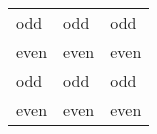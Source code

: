 \documentclass{article}
\begin{document}
    \begin{center}

        \begin{tabular}{lll}
            odd 	& odd 	& odd \\
            even 	& even 	& even\\
            odd 	& odd 	& odd \\
            even 	& even 	& even\\
        \end{tabular}
    \end{center}
\end{document}
